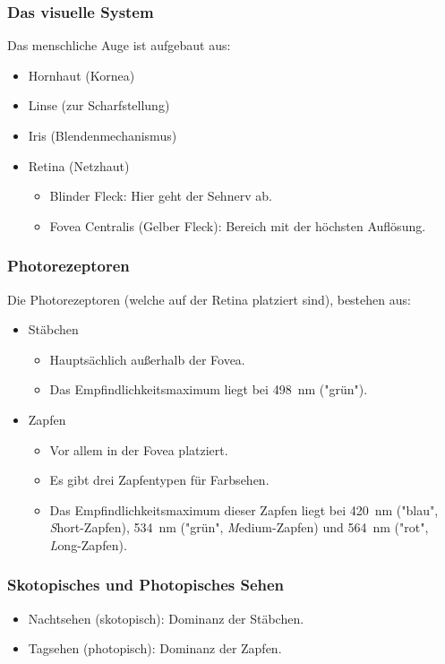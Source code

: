 			\subsubsection{Das visuelle System}
				Das menschliche Auge ist aufgebaut aus:
				\begin{itemize}
					\item Hornhaut (Kornea)
					\item Linse (zur Scharfstellung)
					\item Iris (Blendenmechanismus)
					\item Retina (Netzhaut)
						\begin{itemize}
							\item Blinder Fleck: Hier geht der Sehnerv ab.
							\item Fovea Centralis (Gelber Fleck): Bereich mit der höchsten Auflösung.
						\end{itemize}
				\end{itemize}

			\subsubsection{Photorezeptoren}
				Die Photorezeptoren (welche auf der Retina platziert sind), bestehen aus:
				\begin{itemize}
					\item Stäbchen
						\begin{itemize}
							\item Hauptsächlich außerhalb der Fovea.
							\item Das Empfindlichkeitsmaximum liegt bei \SI{498}{\nano\meter} ("grün").
						\end{itemize}
					\item Zapfen
						\begin{itemize}
							\item Vor allem in der Fovea platziert.
							\item Es gibt drei Zapfentypen für Farbsehen.
							\item Das Empfindlichkeitsmaximum dieser Zapfen liegt bei \SI{420}{\nano\meter} ("blau", \emph{S}hort-Zapfen), \SI{534}{\nano\meter} ("grün", \emph{M}edium-Zapfen) und \SI{564}{\nano\meter} ("rot", \emph{L}ong-Zapfen).
						\end{itemize}
				\end{itemize}

			\subsubsection{Skotopisches und Photopisches Sehen}
				\begin{itemize}
					\item Nachtsehen (skotopisch): Dominanz der Stäbchen.
					\item Tagsehen (photopisch): Dominanz der Zapfen.
				\end{itemize}

